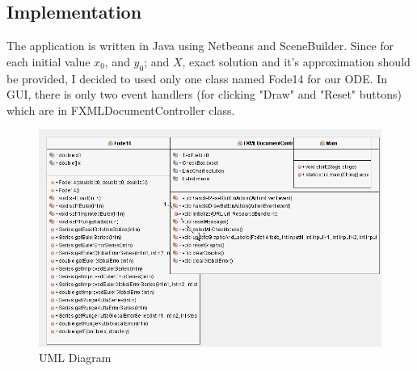 \subsection{Implementation}

The application is written in Java using Netbeans and SceneBuilder. Since for each initial value $x_0$, and $y_0$; and $X$, exact solution and it's approximation should be provided, I decided to used only one class named Fode14 for our ODE. In GUI, there is only two event handlers (for clicking "Draw" and "Reset" buttons) which are in FXMLDocumentController class.

\begin{figure}[H]
	\centering
	\includegraphics[width=\linewidth]{image/uml.png}
	\caption{UML Diagram}
	\label{fig:uml}
\end{figure}

